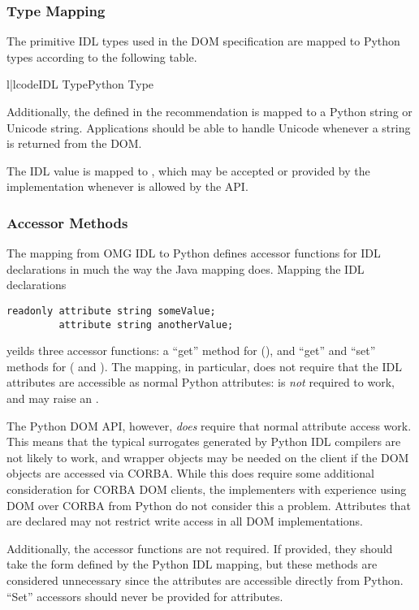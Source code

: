 \subsubsection{Type Mapping \label{dom-type-mapping}}

The primitive IDL types used in the DOM specification are mapped to
Python types according to the following table.

\begin{tableii}{l|l}{code}{IDL Type}{Python Type}
\end{tableii}

Additionally, the  defined in the recommendation is
mapped to a Python string or Unicode string.  Applications should
be able to handle Unicode whenever a string is returned from the DOM.

The IDL  value is mapped to , which may be
accepted or provided by the implementation whenever  is
allowed by the API.


\subsubsection{Accessor Methods \label{dom-accessor-methods}}

The mapping from OMG IDL to Python defines accessor functions for IDL
 declarations in much the way the Java mapping
does.  Mapping the IDL declarations

\begin{verbatim}
readonly attribute string someValue;
         attribute string anotherValue;
\end{verbatim}

yeilds three accessor functions:  a ``get'' method for
 (), and ``get'' and
``set'' methods for
 ( and
).  The mapping, in particular, does not
require that the IDL attributes are accessible as normal Python
attributes:   is \emph{not} required to
work, and may raise an .

The Python DOM API, however, \emph{does} require that normal attribute
access work.  This means that the typical surrogates generated by
Python IDL compilers are not likely to work, and wrapper objects may
be needed on the client if the DOM objects are accessed via CORBA.
While this does require some additional consideration for CORBA DOM
clients, the implementers with experience using DOM over CORBA from
Python do not consider this a problem.  Attributes that are declared
 may not restrict write access in all DOM
implementations.

Additionally, the accessor functions are not required.  If provided,
they should take the form defined by the Python IDL mapping, but
these methods are considered unnecessary since the attributes are
accessible directly from Python.  ``Set'' accessors should never be
provided for  attributes.
